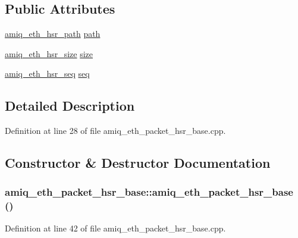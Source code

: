 \subsection*{Public Attributes}
\begin{DoxyCompactItemize}
\item 
\hyperlink{amiq__eth__types_8cpp_a711678215c846f8acb30e2e6afdccd91}{amiq\_\-eth\_\-hsr\_\-path} \hyperlink{classamiq__eth__packet__hsr__base_a27533834175513de14aaf23193acec8c}{path}
\item 
\hyperlink{amiq__eth__types_8cpp_ac7dad46587d420a4c73201a465e51ae4}{amiq\_\-eth\_\-hsr\_\-size} \hyperlink{classamiq__eth__packet__hsr__base_aeb5c412d0bf3e9fda200043e041b0cb9}{size}
\item 
\hyperlink{amiq__eth__types_8cpp_a1c11c5ae0884f43b68ec9dd80a9b6356}{amiq\_\-eth\_\-hsr\_\-seq} \hyperlink{classamiq__eth__packet__hsr__base_a15d40516f06a90dfaf7f977e6fa71a98}{seq}
\end{DoxyCompactItemize}


\subsection{Detailed Description}


Definition at line 28 of file amiq\_\-eth\_\-packet\_\-hsr\_\-base.cpp.

\subsection{Constructor \& Destructor Documentation}
\hypertarget{classamiq__eth__packet__hsr__base_a2c991d5a518f757b9243d34a5adf4854}{
\subsubsection[{amiq\_\-eth\_\-packet\_\-hsr\_\-base}]{\setlength{\rightskip}{0pt plus 5cm}amiq\_\-eth\_\-packet\_\-hsr\_\-base::amiq\_\-eth\_\-packet\_\-hsr\_\-base ()}}
\label{classamiq__eth__packet__hsr__base_a2c991d5a518f757b9243d34a5adf4854}


Definition at line 42 of file amiq\_\-eth\_\-packet\_\-hsr\_\-base.cpp.

